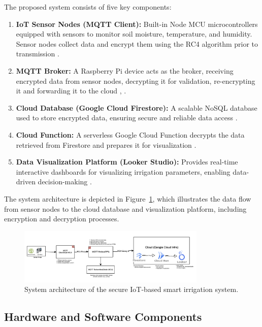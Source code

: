 \documentclass[journal]{Definitions/mdpi}
\begin{document}
The proposed system consists of five key components:
\begin{enumerate}
    \item \textbf{IoT Sensor Nodes (MQTT Client):} Built-in Node MCU microcontrollers equipped with sensors to monitor soil moisture, temperature, and humidity. Sensor nodes collect data and encrypt them using the RC4 algorithm prior to transmission \cite{ref-journal2}.
    \item \textbf{MQTT Broker:} A Raspberry Pi device acts as the broker, receiving encrypted data from sensor nodes, decrypting it for validation, re-encrypting it and forwarding it to the cloud \cite{ref-standards2}, \cite{ref-conference2}.
    \item \textbf{Cloud Database (Google Cloud Firestore):} A scalable NoSQL database used to store encrypted data, ensuring secure and reliable data access \cite{ref-cloud1}.
    \item \textbf{Cloud Function:} A serverless Google Cloud Function decrypts the data retrieved from Firestore and prepares it for visualization \cite{ref-cloud3}.
    \item \textbf{Data Visualization Platform (Looker Studio):} Provides real-time interactive dashboards for visualizing irrigation parameters, enabling data-driven decision-making \cite{ref-cloud2}.
\end{enumerate}

The system architecture is depicted in Figure~\ref{fig:system_architecture}, which illustrates the data flow from sensor nodes to the cloud database and visualization platform, including encryption and decryption processes.

\begin{figure}[H]
\centering
\includegraphics[width=0.8\textwidth]{detailed_arch.png}
\caption{System architecture of the secure IoT-based smart irrigation system.}
\label{fig:system_architecture}
\end{figure}
\subsection{Hardware and Software Components}
\end{document}
